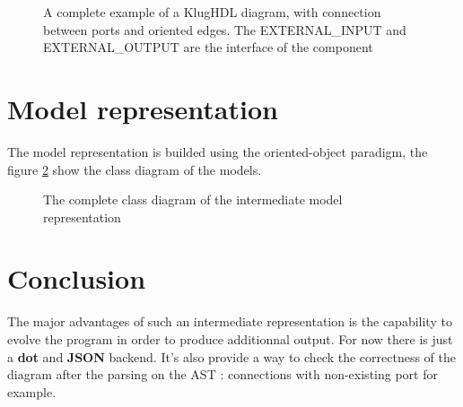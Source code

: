 \begin{figure}[h]
  \centering
  \caption[Complete example of a KlugHDL diagram]{A complete example of a KlugHDL diagram, with connection between ports and oriented edges. The EXTERNAL\_INPUT and EXTERNAL\_OUTPUT are the interface of the component}
  \label{fig:example-spinal-diag}
\end{figure}

\section{Model representation}

The model representation is builded using the oriented-object paradigm, the figure \ref{fig:model-class-diagram} show the class diagram of the models.

\begin{figure}[h]
  \centering
  \caption[Class diagram of the intermediate model]{The complete class diagram of the intermediate model representation}
  \label{fig:model-class-diagram}
\end{figure}

\section{Conclusion}

The major advantages of such an intermediate representation is the capability to evolve the program in order to produce additionnal output. For now there is just a \textbf{dot} and \textbf{JSON} backend. It's also provide a way to check the correctness of the diagram after the parsing on the AST : connections with non-existing port for example.
